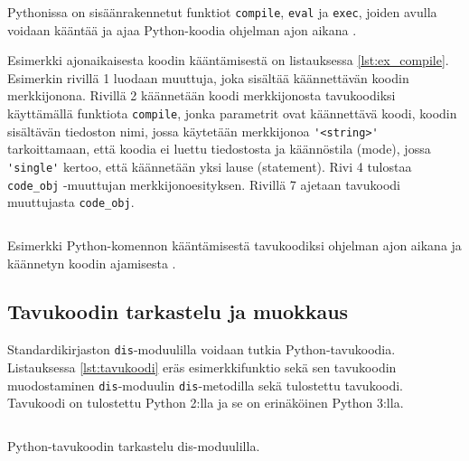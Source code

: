 \documentclass[finnish]{tktltiki2}
\theoremstyle{definition}
\theoremstyle{remark}
\begin{document}





Pythonissa on sisäänrakennetut funktiot \verb|compile|, \verb|eval| ja \verb|exec|, joiden avulla voidaan kääntää ja ajaa Python-koodia ohjelman ajon aikana \cite{codeobjects,martelli2006python}.

Esimerkki ajonaikaisesta koodin kääntämisestä on listauksessa \ref{lst:ex_compile}. Esimerkin rivillä 1 luodaan muuttuja, joka sisältää käännettävän koodin merkkijonona. Rivillä 2 käännetään koodi merkkijonosta tavukoodiksi käyttämällä funktiota \verb|compile|, jonka parametrit ovat käännettävä koodi, koodin sisältävän tiedoston nimi, jossa käytetään merkkijonoa \verb|'<string>'| tarkoittamaan, että koodia ei luettu tiedostosta ja käännöstila (mode), jossa \verb|'single'| kertoo, että käännetään yksi lause (statement). Rivi 4 tulostaa \verb|code_obj| -muuttujan merkkijonoesityksen. Rivillä 7 ajetaan tavukoodi muuttujasta \verb|code_obj|.

\begin{listing}
    \inputminted[linenos]{python}{code/dynamichello.py}
    \caption{Esimerkki Python-komennon kääntämisestä tavukoodiksi ohjelman ajon aikana ja käännetyn koodin ajamisesta \cite{codeobjects}.}
    \label{lst:ex_compile}
\end{listing}


\subsection{Tavukoodin tarkastelu ja muokkaus}

Standardikirjaston \verb|dis|-moduulilla voidaan tutkia Python-tavukoodia. Listauksessa \ref{lst:tavukoodi} eräs esimerkkifunktio sekä sen tavukoodin muodostaminen \verb|dis|-moduulin \verb|dis|-metodilla sekä tulostettu tavukoodi. Tavukoodi on tulostettu Python 2:lla ja se on erinäköinen Python 3:lla.

\begin{listing}
    \inputminted[linenos]{python}{code/tavukoodi.py}
    \caption{Python-tavukoodin tarkastelu dis-moduulilla.}
    \label{lst:tavukoodi}
\end{listing}
\end{document}
